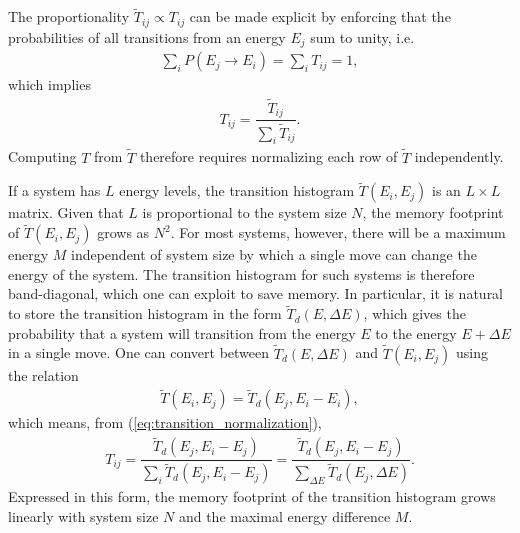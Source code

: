 \documentclass[11pt]{article}
\newcommand{\f}[2]{\dfrac{#1}{#2}} %
\newcommand{\p}[1]{\left(#1\right)} %
\begin{document}
The proportionality $\tilde T_{ij}\propto T_{ij}$ can be made explicit
by enforcing that the probabilities of all transitions from an energy
$E_j$ sum to unity, i.e.
\begin{align}
  \sum_iP\p{E_j\to E_i}=\sum_iT_{ij}=1,
  \label{eq:transition_norm_condition}
\end{align}
which implies
\begin{align}
  T_{ij}=\f{\tilde T_{ij}}{\sum_i\tilde T_{ij}}.
  \label{eq:transition_normalization}
\end{align}
Computing $T$ from $\tilde T$ therefore requires normalizing each row
of $\tilde T$ independently.

If a system has $L$ energy levels, the transition histogram $\tilde
T\p{E_i,E_j}$ is an $L\times L$ matrix. Given that $L$ is proportional
to the system size $N$, the memory footprint of $\tilde T\p{E_i,E_j}$
grows as $N^2$. For most systems, however, there will be a maximum
energy $M$ independent of system size by which a single move can
change the energy of the system. The transition histogram for such
systems is therefore band-diagonal, which one can exploit to save
memory. In particular, it is natural to store the transition histogram
in the form $\tilde T_d\p{E,\Delta E}$, which gives the probability
that a system will transition from the energy $E$ to the energy
$E+\Delta E$ in a single move. One can convert between $\tilde
T_d\p{E,\Delta E}$ and $\tilde T\p{E_i,E_j}$ using the relation
\begin{align}
  \tilde T\p{E_i,E_j}=\tilde T_d\p{E_j,E_i-E_i},
\end{align}
which means, from (\ref{eq:transition_normalization}),
\begin{align}
  T_{ij}=\f{\tilde T_d\p{E_j,E_i-E_j}}{\sum_i\tilde
    T_d\p{E_j,E_i-E_j}} =\f{\tilde T_d\p{E_j,E_i-E_j}} {\sum_{\Delta
      E}\tilde T_d\p{E_j,\Delta E}}.
  \label{eq:transition_conversion}
\end{align}
Expressed in this form, the memory footprint of the transition
histogram grows linearly with system size $N$ and the maximal energy
difference $M$.
\end{document}
